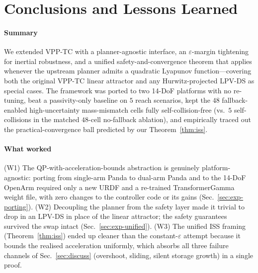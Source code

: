 \documentclass[10pt,conference]{IEEEtran}
\theoremstyle{remark}
\theoremstyle{plain}
\begin{document}
\section{Conclusions and Lessons Learned}
\label{sec:conclusion}

\paragraph*{Summary} We extended VPP-TC with a planner-agnostic
interface, an $\varepsilon$-margin tightening for inertial
robustness, and a unified safety-and-convergence theorem that
applies whenever the upstream planner admits a quadratic Lyapunov
function---covering both the original VPP-TC linear attractor and
any Hurwitz-projected LPV-DS as special cases. The framework was
ported to two 14-DoF platforms with no re-tuning, beat a
passivity-only baseline on $5$ reach scenarios, kept the $48$
fallback-enabled high-uncertainty mass-mismatch cells fully
self-collision-free (vs.\ $5$ self-collisions in the matched
$48$-cell no-fallback ablation), and empirically traced out the
practical-convergence ball predicted by our
Theorem~\ref{thm:iss}.

\paragraph*{What worked} (W1) The QP-with-acceleration-bounds
abstraction is genuinely platform-agnostic: porting from
single-arm Panda to dual-arm Panda and to the 14-DoF OpenArm
required only a new URDF and a re-trained TransformerGamma weight
file, with zero changes to the controller code or its gains
(Sec.~\ref{sec:exp-porting}). (W2) Decoupling the planner from
the safety layer made it trivial to drop in an LPV-DS in place
of the linear attractor; the safety guarantees survived the swap
intact (Sec.~\ref{sec:exp-unified}). (W3) The unified ISS framing
(Theorem~\ref{thm:iss}) ended up cleaner than the constant-$\varepsilon$
attempt because it bounds the realised acceleration uniformly,
which absorbs all three failure channels of
Sec.~\ref{sec:discuss} (overshoot, sliding, silent storage growth)
in a single proof.
\end{document}
